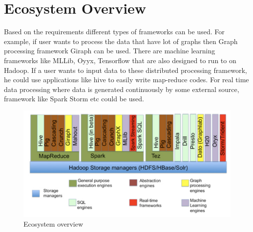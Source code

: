 \documentclass[twoside]{article}
\begin{document}
\section{Ecosystem Overview}
Based on the requirements different types of frameworks can be used. For example, if user wants to process the data that have lot of graphs then Graph processing framework Giraph can be used. There are machine learning frameworks like MLLib, Oyyx, Tensorflow that are also designed to run to on Hadoop. If a user wants to input data to these distributed processing framework, he could use applications like hive to easily write map-reduce codes. For real time data processing where data is generated continuously by some external source, framework like Spark Storm etc could be used.
\begin{figure}[H]
\centering
\includegraphics[width=150mm]{Ecosystem.png}
\caption{Ecosystem overview \label{overflow}}
\end{figure}
\end{document}

